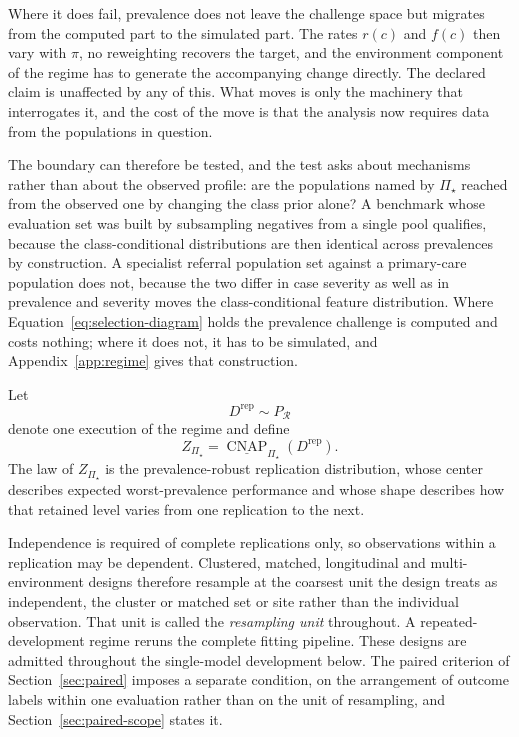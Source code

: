 \documentclass[11pt]{article}
\newcommand{\CNAP}{\operatorname{CNAP}}
\newcommand{\Regime}{\mathcal{R}}
\newcommand{\PSet}{\Pi_\star}
\newcommand{\RobCNAP}{\underline{\CNAP}_{\PSet}}
\theoremstyle{remark}
\begin{document}
Where it does fail, prevalence does not leave the challenge space but migrates from the computed part to the simulated part. The rates $r(c)$ and $f(c)$ then vary with $\pi$, no reweighting recovers the target, and the environment component of the regime has to generate the accompanying change directly. The declared claim is unaffected by any of this. What moves is only the machinery that interrogates it, and the cost of the move is that the analysis now requires data from the populations in question.

The boundary can therefore be tested, and the test asks about mechanisms rather than about the observed profile: are the populations named by $\PSet$ reached from the observed one by changing the class prior alone? A benchmark whose evaluation set was built by subsampling negatives from a single pool qualifies, because the class-conditional distributions are then identical across prevalences by construction. A specialist referral population set against a primary-care population does not, because the two differ in case severity as well as in prevalence and severity moves the class-conditional feature distribution. Where Equation~\eqref{eq:selection-diagram} holds the prevalence challenge is computed and costs nothing; where it does not, it has to be simulated, and Appendix~\ref{app:regime} gives that construction.

Let
\[
D^{\mathrm{rep}}\sim P_{\Regime}
\]
denote one execution of the regime and define
\begin{equation}
Z_{\PSet}
=
\RobCNAP(D^{\mathrm{rep}}).
\label{eq:robust-replication-effect}
\end{equation}
The law of $Z_{\PSet}$ is the prevalence-robust replication distribution, whose center describes expected worst-prevalence performance and whose shape describes how that retained level varies from one replication to the next.

Independence is required of complete replications only, so observations within a replication may be dependent. Clustered, matched, longitudinal and multi-environment designs therefore resample at the coarsest unit the design treats as independent, the cluster or matched set or site rather than the individual observation. That unit is called the \emph{resampling unit} throughout. A repeated-development regime reruns the complete fitting pipeline. These designs are admitted throughout the single-model development below. The paired criterion of Section~\ref{sec:paired} imposes a separate condition, on the arrangement of outcome labels within one evaluation rather than on the unit of resampling, and Section~\ref{sec:paired-scope} states it.
\end{document}
